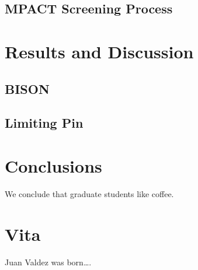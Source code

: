\documentclass[edeposit,fullpage]{uiucthesis2009}
\begin{document}
\section{MPACT Screening Process}

\chapter{Results and Discussion}

\section{BISON}

\section{Limiting Pin}

\chapter{Conclusions}

We conclude that graduate students like coffee.

\backmatter



\chapter{Vita}

Juan Valdez was born\ldots.
\end{document}
